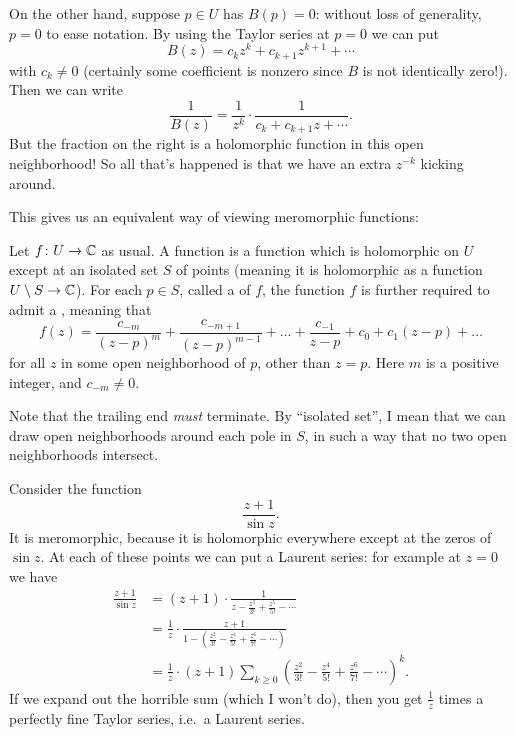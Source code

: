 On the other hand, suppose $p \in U$ has $B(p) = 0$: without loss of generality, $p=0$
to ease notation.
By using the Taylor series at $p=0$ we can put
\[ B(z) = c_k z^k + c_{k+1} z^{k+1} + \cdots \]
with $c_k \neq 0$
(certainly some coefficient is nonzero since $B$ is not identically zero!).
Then we can write
\[ \frac{1}{B(z)} = \frac{1}{z^k} \cdot \frac{1}{c_k + c_{k+1}z + \cdots}. \]
But the fraction on the right is a
holomorphic function in this open neighborhood!
So all that's happened is that we have an extra $z^{-k}$ kicking around.


This gives us an equivalent way of viewing meromorphic functions:

\begin{definition}
	Let $f \colon U \to \mathbb C$ as usual.
	A  function is a function which is holomorphic on $U$
	except at an isolated set $S$ of points
	(meaning it is holomorphic as a function $U \setminus S \to \mathbb C$).
	For each $p \in S$, called a  of $f$,
	the function $f$ is further required to admit a , meaning that
	\[
		f(z) =
		\frac{c_{-m}}{(z-p)^m}
		+ \frac{c_{-m+1}}{(z-p)^{m-1}}
		+ \dots
		+ \frac{c_{-1}}{z-p} + c_0 + c_1 (z-p) + \dots
	\]
	for all $z$ in some open neighborhood of $p$, other than $z = p$.
	Here $m$ is a positive integer, and $c_{-m} \neq 0$.
\end{definition}
Note that the trailing end \emph{must} terminate.
By ``isolated set'', I mean that we can draw
open neighborhoods around each pole in $S$,
in such a way that no two open neighborhoods intersect.

\begin{example}
	Consider the function \[ \frac{z+1}{\sin z}. \]
	It is meromorphic, because it is holomorphic everywhere except at the zeros of $\sin z$.
	At each of these points we can put a Laurent series: for example at $z=0$ we have
	\begin{align*}
		\frac{z+1}{\sin z}
		&= (z+1) \cdot \frac{1}{z - \frac{z^3}{3!} + \frac{z^5}{5!} - \dotsb} \\
		&= \frac 1z \cdot \frac{z+1}{1 - \left(%
			\frac{z^2}{3!} - \frac{z^4}{5!} + \frac{z^6}{7!} - \dotsb \right)} \\
		&= \frac 1z \cdot (z+1) \sum_{k \ge 0} \left( %
			\frac{z^2}{3!}-\frac{z^4}{5!}+\frac{z^6}{7!}-\dotsb \right)^k.
	\end{align*}
	If we expand out the horrible sum (which I won't do),
	then you get $\frac 1z$ times a perfectly
	fine Taylor series, i.e.\ a Laurent series.
\end{example}

